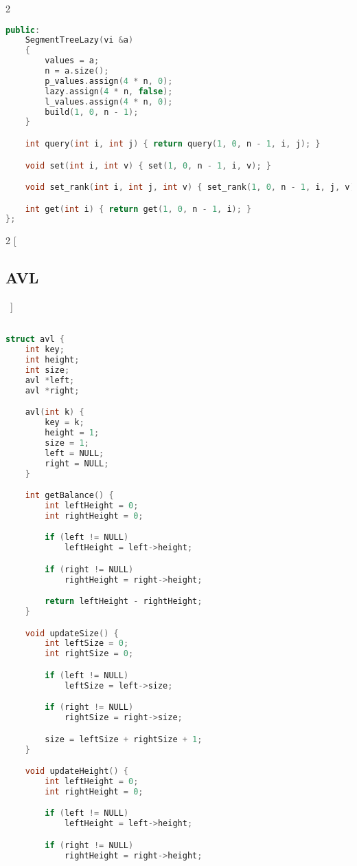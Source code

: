 \documentclass[leter]{amsart}
\begin{document}
\begin{multicols}{2}
\begin{lstlisting}[language=C++]
public:
    SegmentTreeLazy(vi &a)
    {
        values = a;
        n = a.size();
        p_values.assign(4 * n, 0);
        lazy.assign(4 * n, false);
        l_values.assign(4 * n, 0);
        build(1, 0, n - 1);
    }

    int query(int i, int j) { return query(1, 0, n - 1, i, j); }

    void set(int i, int v) { set(1, 0, n - 1, i, v); }

    void set_rank(int i, int j, int v) { set_rank(1, 0, n - 1, i, j, v); }

    int get(int i) { return get(1, 0, n - 1, i); }
};

\end{lstlisting}
\end{multicols}
\begin{multicols}{2}
[\subsection{AVL}\ ]
\begin{lstlisting}[language=C++]

struct avl {
    int key;
    int height;
    int size;
    avl *left;
    avl *right;

    avl(int k) {
        key = k;
        height = 1;
        size = 1;
        left = NULL;
        right = NULL;
    }

    int getBalance() {
        int leftHeight = 0;
        int rightHeight = 0;

        if (left != NULL)
            leftHeight = left->height;

        if (right != NULL)
            rightHeight = right->height;

        return leftHeight - rightHeight;
    }

    void updateSize() {
        int leftSize = 0;
        int rightSize = 0;

        if (left != NULL)
            leftSize = left->size;

        if (right != NULL)
            rightSize = right->size;

        size = leftSize + rightSize + 1;
    }

    void updateHeight() {
        int leftHeight = 0;
        int rightHeight = 0;

        if (left != NULL)
            leftHeight = left->height;

        if (right != NULL)
            rightHeight = right->height;


\end{lstlisting}
\end{multicols}
\end{document}
